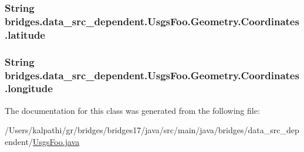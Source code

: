 \subsubsection[{latitude}]{\setlength{\rightskip}{0pt plus 5cm}String bridges.\+data\+\_\+src\+\_\+dependent.\+Usgs\+Foo.\+Geometry.\+Coordinates.\+latitude}\label{classbridges_1_1data__src__dependent_1_1_usgs_foo_1_1_geometry_1_1_coordinates_a8ab648886a19cd5d07f330e1558b8175}
\hypertarget{classbridges_1_1data__src__dependent_1_1_usgs_foo_1_1_geometry_1_1_coordinates_a45f2a0dc4220eb4a1e8ec576101f9633}{}
\subsubsection[{longitude}]{\setlength{\rightskip}{0pt plus 5cm}String bridges.\+data\+\_\+src\+\_\+dependent.\+Usgs\+Foo.\+Geometry.\+Coordinates.\+longitude}\label{classbridges_1_1data__src__dependent_1_1_usgs_foo_1_1_geometry_1_1_coordinates_a45f2a0dc4220eb4a1e8ec576101f9633}


The documentation for this class was generated from the following file\+:\begin{DoxyCompactItemize}
\item 
/\+Users/kalpathi/gr/bridges/bridges17/java/src/main/java/bridges/data\+\_\+src\+\_\+dependent/\hyperlink{_usgs_foo_8java}{Usgs\+Foo.\+java}\end{DoxyCompactItemize}
